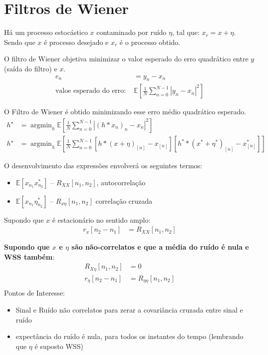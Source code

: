\documentclass{article}
\renewcommand\bf[1]{\textbf{#1}}
\DeclareMathOperator*{\argmin}{argmin} %
\begin{document}
\setlength{\abovedisplayskip}{12pt}
\setlength{\belowdisplayskip}{0.75em}
\setlength{\abovedisplayshortskip}{0pt}
\setlength{\belowdisplayshortskip}{0pt}
\setlength{\jot}{1pt}

\section{Filtros de Wiener}
Há um processo estocástico $x$ contaminado por ruído $\eta$, tal que: $x_r = x + \eta$. Sendo que
$x$ é processo desejado e $x_r$ é o processo obtido.

O filtro de Wiener objetiva minimizar o valor esperado do erro quadrático entre $y$ (saída do
filtro) e $x$.
\begin{align*}
    e_n &= y_n - x_n \\
    \text{valoe esperado do erro: } &\mathbb{E}\left[\frac{1}{N} \sum_{n=0}^{N-1} |y_n - x_n|^2\right]
\end{align*}

O Filtro de Wiener é obtido minimizando esse erro médio quadrático esperado.
\begin{align*}
    h^{\star} &= \argmin_{h} \mathbb{E}\left[ \frac{1}{N} \sum_{n=0}^{N-1} | (h*x_n)_n - x_n |^2 \right] \\
    h^{\star} &= \argmin_{h} \mathbb{E}\left[ \frac{1}{N} \sum_{n=0}^{N-1}
    [h*(x+\eta)_{[n]}-x_{[n]}] [h^* * (x^* + \eta^*)_{[n]} - x_{[n]}^*] \right]
\end{align*}

O desenvolvimento das expressões envolverá os seguintes termos:
\begin{itemize}
    \item $\mathbb{E}[x_{n_1}x_{n_2}^*]$ -- $R_{XX}[n_1, n_2]$, autocorrelação
    \item $\mathbb{E}[x_{n_1}\eta_{n_2}^*]$ -- $R_{x\eta}[n_1,n_2]$ correlação cruzada
\end{itemize}

Supondo que $x$ é estacionário no sentido amplo:
\begin{align*}
    r_x[n_2-n_1] &= R_{XX}[n_1,n_2]
\end{align*}

\bf{Supondo que $x$ e $\eta$ são não-correlatos e que a média do ruído é nula e WSS também}:
\begin{align*}
    R_{X\eta}[n_1,n_2] &= 0 \\
    r_{\eta}[n_2-n_1] &= R_{\eta\eta}[n_1,n_2]\\[-2.5em]
\end{align*}
Pontos de Interesse:
\begin{itemize}
    \setlength\itemsep{0em}
    \item Sinal e Ruído não correlatos para zerar a covariância cruzada entre sinal e ruído
    \item expectância do ruído é nula, para todos os instantes do tempo (lembrando que $\eta$ é
        suposto WSS)
\end{itemize}
\end{document}
